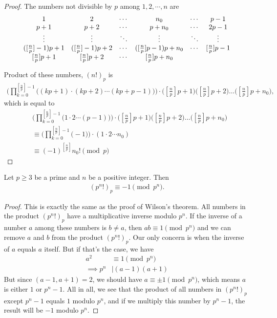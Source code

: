 \documentclass{subfile}
\begin{document}
	\begin{proof}
		The numbers not divisible by $p$ among $1, 2, \cdots, n$ are
			\[\begin{array}{*{20}{c}}
				1&2& \cdots &{{n_0}}& \cdots &{p - 1}\\
				{p + 1}&{p + 2}& \cdots &{p + {n_0}}& \cdots &{2p - 1}\\
				\vdots & \vdots & \ddots & \vdots & \ddots & \vdots \\
				{( {[{\textstyle{n \over p}}] - 1} )p + 1}&{( {[{\textstyle{n \over p}}] - 1} )p + 2}& \cdots &{( {[{\textstyle{n \over p}}]p - 1} )p + {n_0}}& \cdots &{[{\textstyle{n \over p}}]p - 1}\\
				{[{\textstyle{n \over p}}]p + 1}&{[{\textstyle{n \over p}}]p + 2}& \cdots &{[{\textstyle{n \over p}}]p + {n_0}}&{}&{}
			\end{array}\]

	Product of these numbers, $(n!)_p$ is
		\begin{align*}
			\Bigg(\prod_{k=0}^{[\frac np]-1}\!\!\bigl((kp+1)\cdot(kp+2)\cdots(kp+p-1)\bigr)\Bigg)  \cdot
			\bigl([\tfrac np]p+1\bigl)\bigl([\tfrac np]p+2\bigl)\dots\bigl([\tfrac np]p+n_0\bigl),
		\end{align*}
	which is equal to
		\begin{align*}
			& \Bigg(\prod_{k=0}^{[\frac np]-1}\!\!\bigl(1\cdot2\cdots(p-1)\bigr)\Bigg)  \cdot
			\bigl([\tfrac np]p+1\bigl)\bigl([\tfrac np]p+2\bigl)\dots\bigl([\tfrac np]p+n_0\bigl)\\
			&\equiv \Bigg(\prod_{k=0}^{[\frac np]-1}\!\!\bigl(-1\bigr) \Bigg) \cdot \left(
			1 \cdot 2 \cdots n_0\right)\\
			&\equiv
			(-1)^{[\frac np]} n_0!\pmod p
		\end{align*}
	\end{proof}


	\begin{proposition}
		Let $p\geq 3$ be a prime and $n$ be a positive integer. Then
			\begin{align*}
				(p^n!)_p \equiv -1 \pmod{p^n}.
			\end{align*}
	\end{proposition}

	\begin{proof}
		This is exactly the same as the proof of Wilson's theorem. All numbers in the product $(p^n!)_p$ have a multiplicative inverse modulo $p^n$. If the inverse of a number $a$ among these numbers is $b \neq a$, then $a b \equiv 1 \pmod{p^n}$ and we can remove $a$ and $b$ from the product $(p^n!)_p$. Our only concern is when the inverse of $a$ equals $a$ itself. But if that's the case, we have
			\begin{align*}
				a^2
					& \equiv 1 \pmod{p^n}\\
				\implies p^n
					& \mid (a-1)(a+1)
			\end{align*}
		But since $(a-1,a+1)=2$, we should have $a \equiv \pm 1 \pmod{p^n}$, which means $a$ is either $1$ or $p^n-1$. All in all, we see that the product of all numbers in $(p^n!)_p$ except $p^n-1$ equals $1$ modulo $p^n$, and if we multiply this number by $p^n-1$, the result will be $-1$ modulo $p^n$.
	\end{proof}
\end{document}
